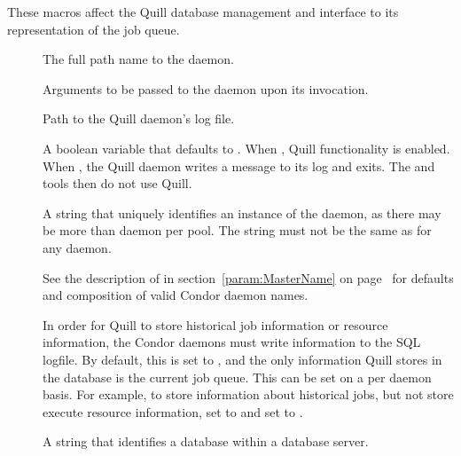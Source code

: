 These macros affect the Quill database
management and interface to its representation of the job queue.

\begin{description}
\item[] \label{param:Quill}  The full path name to the
   daemon.

\item[] \label{param:QuillArgs} Arguments
  to be passed to the  daemon upon its invocation.

\item[] \label{param:QuillLog}
  Path to the Quill daemon's log file.

\item[] \label{param:QuillEnabled}
  A boolean variable that defaults to .
  When , Quill functionality is enabled.
  When , the Quill daemon writes a message to its log and exits.
  The  and  tools then do not use Quill.

\item[] \label{param:QuillName}
  A string that uniquely identifies an instance of the 
  daemon, as there may be more than  daemon per pool.
  The string must not be the same as for any  daemon.

  See the description of  in
  section~\ref{param:MasterName} on page~\pageref{param:MasterName}
  for defaults and composition of valid Condor daemon names.

\item[] \label{param:QuillUseSQLLog}
  In order for Quill to store historical job information or resource
  information, the Condor daemons must write information to the SQL logfile.
  By default, this is set to , and the only information Quill
  stores in the database is the current job queue.
  This can be set on a per daemon basis. For example, to store information
  about historical jobs, but not store execute resource information, set
   to  and set
   to .

\item[] \label{param:QuillDBName}
  A string that identifies a database within a database server.


\end{description}
